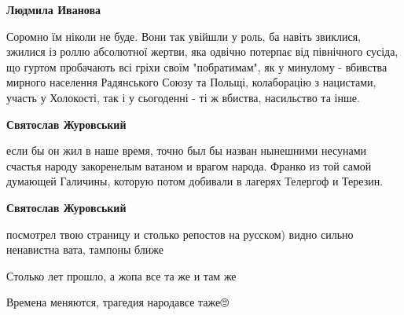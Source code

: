 \begin{itemize}
\begin{itemize}
\textbf{Людмила Иванова} 

Соромно їм ніколи не буде. Вони так увійшли у роль, ба
навіть звиклися, зжилися із роллю абсолютної жертви, яка одвічно потерпає від
північного сусіда, що гуртом пробачають всі гріхи своїм "побратимам", як у
минулому - вбивства мирного населення Радянського Союзу та Польщі, колаборацію
з нацистами, участь у Холокості, так і у сьогоденні - ті ж вбиства, насильство
та інше.

 
\textbf{Святослав Журовський} 

если бы он жил в наше время, точно был бы назван нынешними несунами счастья
народу закоренелым ватаном и врагом народа. Франко из той самой думающей
Галичины, которую потом добивали в лагерях Телергоф и Терезин.

 
\textbf{Святослав Журовський} 

посмотрел твою страницу и столько репостов на русском) видно сильно ненавистна
вата, тампоны ближе

\end{itemize}

 
Столько лет прошло, а жопа все та же и там же

 
Времена меняются, трагедия народавсе таже🙄

 


\end{itemize}
